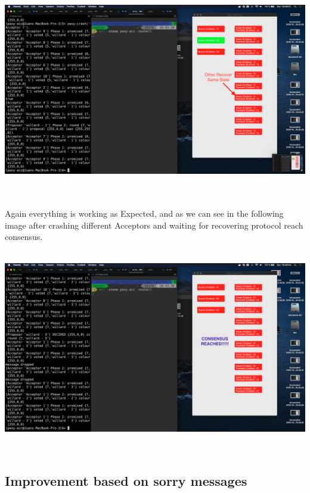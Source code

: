 \documentclass[a4paper, 10pt]{article}
\begin{document}
\begin{minipage}[t]{\linewidth}
  \centering
  \includegraphics[width=\textwidth]{other_recover}
\end{minipage}\\\\

Again everything is working as Expected, and as we can see in the following
image after crashing different Acceptors and waiting for recovering protocol
reach consensus.\\\\

\begin{minipage}[t]{\linewidth}
  \centering
  \includegraphics[width=\textwidth]{consensus}
\end{minipage}\\

\subsection{Improvement based on sorry messages}
\end{document}
